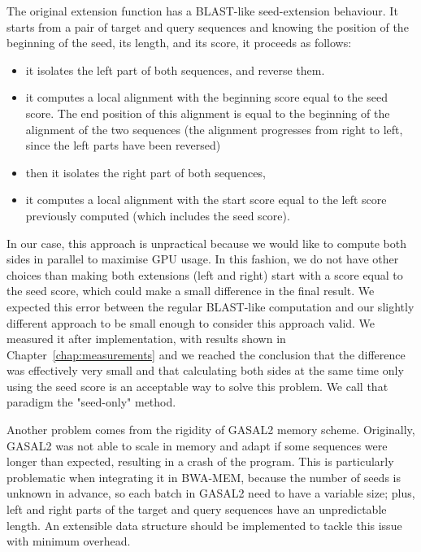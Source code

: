The original extension function has a BLAST-like seed-extension behaviour. It starts from a pair of target and query sequences and knowing the position of the beginning of the seed, its length, and its score, it proceeds as follows:
\begin{itemize}
	\item it isolates the left part of both sequences, and reverse them.
	\item it computes a local alignment with the beginning score equal to the seed score. The end position of this alignment is equal to the beginning of the alignment of the two sequences (the alignment progresses from right to left, since the left parts have been reversed)
	\item then it isolates the right part of both sequences,
	\item it computes a local alignment with the start score equal to the left score previously computed (which includes the seed score).
\end{itemize}

In our case, this approach is unpractical because we would like to compute both sides in parallel to maximise GPU usage. In this fashion, we do not have other choices than making both extensions (left and right) start with a score equal to the seed score, which could make a small difference in the final result. We expected this error between the regular BLAST-like computation and our slightly different approach to be small enough to consider this approach valid. We measured it after implementation, with results shown in Chapter~\ref{chap:measurements} and we reached the conclusion that the difference was effectively very small and that calculating both sides at the same time only using the seed score is an acceptable way to solve this problem. We call that paradigm the "seed-only" method.

Another problem comes from the rigidity of GASAL2 memory scheme. Originally, GASAL2 was not able to scale in memory and adapt if some sequences were longer than expected, resulting in a crash of the program. This is particularly problematic when integrating it in BWA-MEM, because the number of seeds is unknown in advance, so each batch in GASAL2 need to have a variable size; plus, left and right parts of the target and query sequences have an unpredictable length. An extensible data structure should be implemented to tackle this issue with minimum overhead.


